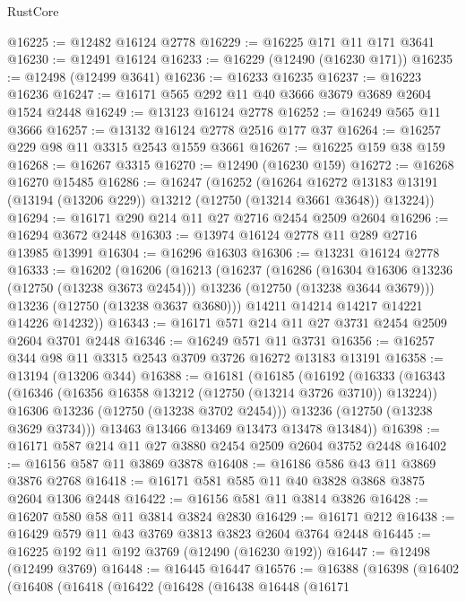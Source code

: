 \begin{lexlean}{RustCore}
\begin{coremodule}
@16225 := @12482 @16124 @2778
@16229 := @16225 @171 @11 @171 @3641
@16230 := @12491 @16124
@16233 := @16229 (@12490 (@16230 @171))
@16235 := @12498 (@12499 @3641)
@16236 := @16233 @16235
@16237 := @16223 @16236
@16247 := @16171 @565 @292 @11 @40 @3666 @3679 @3689 @2604 @1524 @2448
@16249 := @13123 @16124 @2778
@16252 := @16249 @565 @11 @3666
@16257 := @13132 @16124 @2778 @2516 @177 @37
@16264 := @16257 @229 @98 @11 @3315 @2543 @1559 @3661
@16267 := @16225 @159 @38 @159
@16268 := @16267 @3315
@16270 := @12490 (@16230 @159)
@16272 := @16268 @16270 @15485
@16286 := @16247
    (@16252
      (@16264
        @16272
        @13183
        @13191
        (@13194 (@13206 @229))
        @13212
        (@12750 (@13214 @3661 @3648))
        @13224))
@16294 := @16171 @290 @214 @11 @27 @2716 @2454 @2509 @2604
@16296 := @16294 @3672 @2448
@16303 := @13974 @16124 @2778 @11 @289 @2716 @13985 @13991
@16304 := @16296 @16303
@16306 := @13231 @16124 @2778
@16333 := @16202
    (@16206
      (@16213
        (@16237
          (@16286
            (@16304 @16306 @13236 (@12750 (@13238 @3673 @2454)))
            @13236
            (@12750 (@13238 @3644 @3679)))
          @13236
          (@12750 (@13238 @3637 @3680)))
        @14211
        @14214
        @14217
        @14221
        @14226
        @14232))
@16343 := @16171 @571 @214 @11 @27 @3731 @2454 @2509 @2604 @3701 @2448
@16346 := @16249 @571 @11 @3731
@16356 := @16257 @344 @98 @11 @3315 @2543 @3709 @3726 @16272 @13183 @13191
@16358 := @13194 (@13206 @344)
@16388 := @16181
    (@16185
      (@16192
        (@16333
          (@16343
            (@16346 (@16356 @16358 @13212 (@12750 (@13214 @3726 @3710)) @13224))
            @16306
            @13236
            (@12750 (@13238 @3702 @2454)))
          @13236
          (@12750 (@13238 @3629 @3734)))
        @13463
        @13466
        @13469
        @13473
        @13478
        @13484))
@16398 := @16171 @587 @214 @11 @27 @3880 @2454 @2509 @2604 @3752 @2448
@16402 := @16156 @587 @11 @3869 @3878
@16408 := @16186 @586 @43 @11 @3869 @3876 @2768
@16418 := @16171 @581 @585 @11 @40 @3828 @3868 @3875 @2604 @1306 @2448
@16422 := @16156 @581 @11 @3814 @3826
@16428 := @16207 @580 @58 @11 @3814 @3824 @2830
@16429 := @16171 @212
@16438 := @16429 @579 @11 @43 @3769 @3813 @3823 @2604 @3764 @2448
@16445 := @16225 @192 @11 @192 @3769 (@12490 (@16230 @192))
@16447 := @12498 (@12499 @3769)
@16448 := @16445 @16447
@16576 := @16388
    (@16398
      (@16402
        (@16408
          (@16418
            (@16422
              (@16428
                (@16438
                  @16448
                  (@16171

\end{coremodule}
\end{lexlean}
